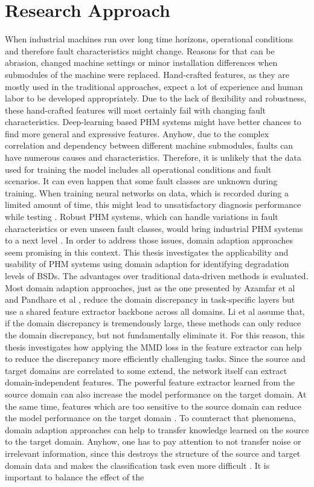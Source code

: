 \chapter{Research Approach}\label{chapter:research_approach}

When industrial machines run over long time horizons, operational conditions and therefore fault characteristics might change. Reasons for that can be abrasion, changed machine settings or minor installation differences when submodules of the machine were replaced. Hand-crafted features, as they are mostly used in the traditional approaches, expect a lot of experience and human labor to be developed appropriately. Due to the lack of flexibility and robustness, these hand-crafted features will most certainly fail with changing fault characteristics. Deep-learning based PHM systems might have better chances to find more general and expressive features. Anyhow, due to the complex correlation and dependency between different machine submodules, faults can have numerous causes and characteristics. Therefore, it is unlikely that the data used for training the model includes all operational conditions and fault scenarios. It can even happen that some fault classes are unknown during training. When training neural networks on data, which is recorded during a limited amount of time, this might lead to unsatisfactory diagnosis performance while testing \cite{AZAMFAR2020103932}. Robust PHM systems, which can handle variations in fault characteristics or even unseen fault classes, would bring industrial PHM systems to a next level \cite{Michau2017}. In order to address those issues, domain adaption approaches seem promising in this context. This thesis investigates the applicability and usability of PHM systems using domain adaption for identifying degradation levels of BSDs. The advantages over traditional data-driven methods is evaluated. Most domain adaption approaches, just as the one presented by Azamfar et al \cite{AZAMFAR2020103932} and Pandhare et al \cite{Pandhare2021}, reduce the domain discrepancy in task-specific layers but use a shared feature extractor backbone across all domains. Li et al \cite{li2020} assume that, if the domain discrepancy is tremendously large, these methods can only reduce the domain discrepancy, but not fundamentally eliminate it. For this reason, this thesis investigates how applying the MMD loss in the feature extractor can help to reduce the discrepancy more efficiently challenging tasks. Since the source and target domains are correlated to some extend, the network itself can extract domain-independent features. The powerful feature extractor learned from the source domain can also increase the model performance on the target domain. At the same time, features which are too sensitive to the source domain can reduce the model performance on the target domain \cite{li2020}. To counteract that phenomena, domain adaption approaches can help to transfer knowledge learned on the source to the target domain. Anyhow, one has to pay attention to not transfer noise or irrelevant information, since this destroys the structure of the source and target domain data and makes the classification task even more difficult \cite{li2020}. It is important to balance the effect of the 